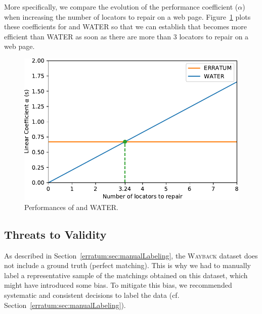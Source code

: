 More specifically, we compare the evolution of the performance coefficient ($\alpha$) when increasing the number of locators to repair on a web page.
Figure~\ref{fig:comparisonLinearCoefficients} plots these coefficients for \erratum and WATER so that we can establish that \erratum{} becomes more efficient than WATER as soon as there are more than 3 locators to repair on a web page.

\begin{figure}[]
  \centering
  \includegraphics[width=.75\linewidth]{erratum/linearRegression}
  \caption{Performances of \erratum and WATER.}
  \label{fig:comparisonLinearCoefficients}
\end{figure}





\subsection{Threats to Validity}\label{erratum:sec:threats}
As described in Section~\ref{erratum:sec:manualLabeling}, the \textsc{Wayback} dataset does not include a ground truth (perfect matching).
This is why we had to manually label a representative sample of the matchings obtained on this dataset, which might have introduced some bias.
To mitigate this bias, we recommended systematic and consistent decisions to label the data (cf. Section~\ref{erratum:sec:manualLabeling}). 

